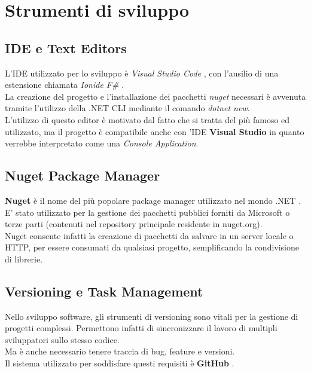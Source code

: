\documentclass[\main/tesi.tex]{subfiles}
\begin{document}
\section{Strumenti di sviluppo}

\subsection{IDE e Text Editors}
L'IDE utilizzato per lo sviluppo è \textit{Visual Studio Code} \cite{vscode}, con l'ausilio di una estensione chiamata \textit{Ionide F\#} \cite{ionide}. \\
La creazione del progetto e l'installazione dei pacchetti \textit{nuget} \cite{nuget} necessari è avvenuta tramite l'utilizzo della .NET CLI mediante il comando \textit{dotnet new}. \\
L'utilizzo di questo editor è motivato dal fatto che si tratta del più famoso ed utilizzato, ma il progetto è compatibile anche con 'IDE \textbf{Visual Studio} \cite{visualstudio} in quanto verrebbe interpretato come una \textit{Console Application}. \\

\subsection{Nuget Package Manager}
\textbf{Nuget} \cite{nuget} è il nome del più popolare package manager utilizzato nel mondo .NET \cite{dotnet}.\\
E' stato utilizzato per la gestione dei pacchetti pubblici forniti da Microsoft o terze parti (contenuti nel repository principale residente in nuget.org).\\
Nuget consente infatti la creazione di pacchetti da salvare in un server locale o HTTP, per essere consumati da qualsiasi progetto, semplificando la condivisione di librerie.\\

\subsection{Versioning e Task Management}
Nello sviluppo software, gli strumenti di versioning sono vitali per la gestione di progetti complessi.
Permettono infatti di sincronizzare il lavoro di multipli sviluppatori sullo stesso codice.\\
Ma è anche necessario tenere traccia di bug, feature e versioni.\\
Il sistema utilizzato per soddisfare questi requisiti è \textbf{GitHub} \cite{github}.\\
\end{document}
